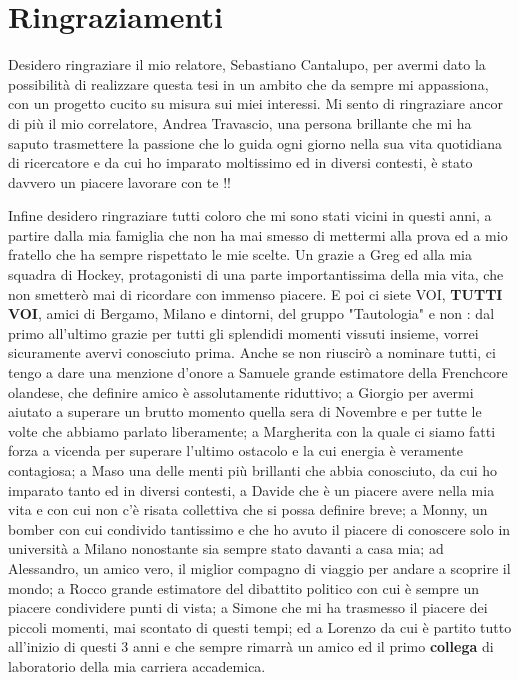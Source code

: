 \chapter*{Ringraziamenti}
Desidero ringraziare il mio relatore, Sebastiano Cantalupo, per avermi dato la possibilità di realizzare questa tesi in un ambito che da sempre mi appassiona, con un progetto cucito su misura sui miei interessi. Mi sento di ringraziare ancor di più il mio correlatore, Andrea Travascio, una persona brillante che mi ha saputo trasmettere la passione che lo guida ogni giorno nella sua vita quotidiana di ricercatore e da cui ho imparato moltissimo ed in diversi contesti, è stato davvero un piacere lavorare con te !!

Infine desidero ringraziare tutti coloro che mi sono stati vicini in questi anni, a partire dalla mia famiglia che non ha mai smesso di mettermi alla prova ed a mio fratello che ha sempre rispettato le mie scelte. 
Un grazie a Greg ed alla mia squadra di Hockey, protagonisti di una parte importantissima della mia vita, che non smetterò mai di ricordare con immenso piacere.
E poi ci siete VOI, \textbf{TUTTI VOI}, amici di Bergamo, Milano e dintorni, del gruppo "Tautologia" e non : dal primo all’ultimo grazie per tutti gli splendidi momenti vissuti insieme, vorrei sicuramente avervi conosciuto prima. Anche se non riuscirò a nominare tutti, ci tengo a dare una menzione d'onore a Samuele grande estimatore della Frenchcore olandese, che definire amico è assolutamente riduttivo; a Giorgio per avermi aiutato a superare un brutto momento quella sera di Novembre e per tutte le volte che abbiamo parlato liberamente; a Margherita con la quale ci siamo fatti forza a vicenda per superare l'ultimo ostacolo e la cui energia è veramente contagiosa; a Maso una delle menti più brillanti che abbia conosciuto, da cui ho imparato tanto ed in diversi contesti, a Davide che è un piacere avere nella mia vita e con cui non c'è risata collettiva che si possa definire breve; a Monny, un bomber con cui condivido tantissimo e che ho avuto il piacere di conoscere solo in università a Milano nonostante sia sempre stato davanti a casa mia; ad Alessandro, un amico vero, il miglior compagno di viaggio per andare a scoprire il mondo; a Rocco grande estimatore del dibattito politico con cui è sempre un piacere condividere punti di vista; a Simone che mi ha trasmesso il piacere dei piccoli momenti, mai scontato di questi tempi; ed a Lorenzo da cui è partito tutto all'inizio di questi 3 anni e che sempre rimarrà un amico ed il primo \textbf{collega} di laboratorio della mia carriera accademica.


